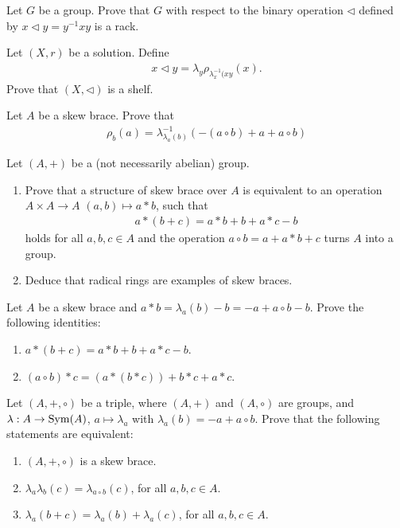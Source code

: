 \documentclass[12pt]{amsproc}
\begin{document}
\begin{xca}
    Let $G$ be a group. 
    Prove that $G$ with respect to the binary operation $\triangleleft$ defined by $x\triangleleft y =y^{-1}xy$ is a rack.
\end{xca}

\begin{xca}
    Let $(X,r)$ be a solution. Define 
    \begin{align*}
        x\triangleleft y = \lambda_y\rho_{\lambda_x^{-1}(xy}(x).
    \end{align*}
    Prove that $(X,\triangleleft)$ is a shelf.
\end{xca}


\begin{xca}
    Let $A$ be a skew brace. Prove that
    \begin{align*}
        \rho_b(a) = \lambda^{-1}_{\lambda_a(b)}(-(a\circ b) +a+a\circ b)
    \end{align*}
\end{xca}

\begin{xca}
    Let $(A,+)$ be a (not necessarily abelian) group. 
    \begin{enumerate}
        \item Prove that a structure of skew brace over $A$ is equivalent to an operation $A\times A \to A$ $(a,b)\mapsto a\ast b$, such that
        \begin{align*}
            a \ast (b+c) = a\ast b + b + a\ast c - b
        \end{align*}
        holds for all $a,b,c \in A$ and the operation $a\circ b = a+ a\ast b + c$ turns $A$ into a group.
        \item Deduce that radical rings are examples of skew braces. 
        \end{enumerate}
\end{xca}

\begin{xca}
    Let $A$ be a skew brace and $a\ast b = \lambda_a(b)-b = -a+a\circ b - b$. Prove the following identities:
    \begin{enumerate}
        \item $a\ast (b+c) = a\ast b + b +a\ast c -b$.
        \item $(a\circ b)\ast c = (a\ast(b\ast c)) + b\ast c + a\ast c$.
    \end{enumerate}
\end{xca}

\begin{xca}
    Let $(A,+,\circ)$ be a triple, where $(A,+)$ and $(A,\circ)$ are groups, and $\lambda: A \to \operatorname{Sym}(A)$, $a\mapsto \lambda_a$ with $\lambda_a(b)=-a+a\circ b$. Prove that the following statements are equivalent:
    \begin{enumerate}
        \item $(A,+,\circ)$ is a skew brace.
        \item $\lambda_a\lambda_b(c)=\lambda_{a\circ b}(c)$, for all $a,b,c\in A$.
        \item $\lambda_a(b+c) = \lambda_a(b)+\lambda_a(c)$, for all $a,b,c\in A$.
    \end{enumerate}
\end{xca}
\end{document}
